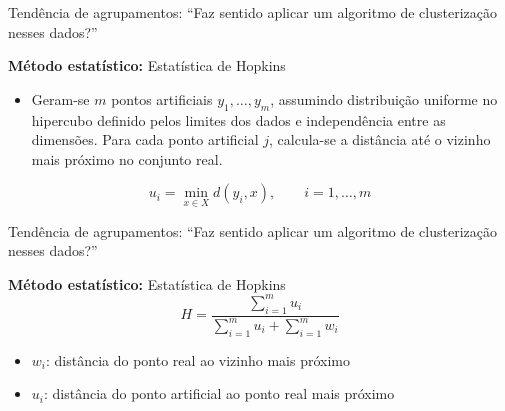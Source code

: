 \documentclass[
  ignorenonframetext,
  aspectratio=169,
]{beamer}
\providecommand{\tightlist}{%
  \setlength{\itemsep}{0pt}\setlength{\parskip}{0pt}}
\begin{document}
\begin{frame}{Tendência de agrupamentos: ``Faz sentido aplicar um
algoritmo de clusterização nesses dados?''}
\protect{}\label{tenduxeancia-de-agrupamentos-faz-sentido-aplicar-um-algoritmo-de-clusterizauxe7uxe3o-nesses-dados-3}
\begin{block}{\textbf{Método estatístico:} Estatística de Hopkins}
\protect{}\label{muxe9todo-estatuxedstico-estatuxedstica-de-hopkins-3}
\begin{itemize}
\tightlist
\item
  Geram-se \(m\) pontos artificiais \(y_1, \ldots, y_m\), assumindo
  distribuição uniforme no hipercubo definido pelos limites dos dados e
  independência entre as dimensões. Para cada ponto artificial \(j\),
  calcula-se a distância até o vizinho mais próximo no conjunto real.
\end{itemize}

\[
u_i
=
\min_{x \in X}
d(y_i, x),
\qquad i = 1,\ldots,m
\]
\end{block}
\end{frame}

\begin{frame}{Tendência de agrupamentos: ``Faz sentido aplicar um
algoritmo de clusterização nesses dados?''}
\protect{}\label{tenduxeancia-de-agrupamentos-faz-sentido-aplicar-um-algoritmo-de-clusterizauxe7uxe3o-nesses-dados-4}
\begin{block}{\textbf{Método estatístico:} Estatística de Hopkins}
\protect{}\label{muxe9todo-estatuxedstico-estatuxedstica-de-hopkins-4}
\[H = \dfrac{\sum \limits_{i=1}^m u_i}{\sum \limits_{i=1}^m u_i + \sum \limits_{i=1}^m w_i}\]

\begin{itemize}
\item
  \(w_i\): distância do ponto real ao vizinho mais próximo
\item
  \(u_i\): distância do ponto artificial ao ponto real mais próximo
\end{itemize}
\end{block}
\end{frame}
\end{document}
